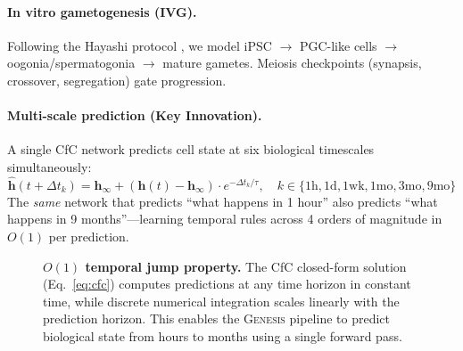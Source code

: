 \documentclass[11pt,letterpaper]{article}
\newcommand{\hv}{\mathbf{h}}
\newcommand{\genesis}{\textsc{Genesis}}
\begin{document}
\paragraph{In vitro gametogenesis (IVG).} Following the Hayashi protocol
\cite{hayashi2016offspring}, we model iPSC $\rightarrow$ PGC-like cells
$\rightarrow$ oogonia/spermatogonia $\rightarrow$ mature gametes. Meiosis
checkpoints (synapsis, crossover, segregation) gate progression.

\paragraph{Multi-scale prediction (Key Innovation).} A single CfC network
predicts cell state at six biological timescales simultaneously:
\begin{equation}
\hat{\hv}(t + \Delta t_k) = \hv_\infty + (\hv(t) - \hv_\infty) \cdot e^{-\Delta t_k / \tau}, \quad k \in \{1\text{h}, 1\text{d}, 1\text{wk}, 1\text{mo}, 3\text{mo}, 9\text{mo}\}
\label{eq:multiscale}
\end{equation}
The \emph{same} network that predicts ``what happens in 1 hour'' also predicts
``what happens in 9 months''---learning temporal rules across 4 orders of
magnitude in $O(1)$ per prediction.

\begin{figure}[htbp]
\centering
{}
\caption{\textbf{$O(1)$ temporal jump property.} The CfC closed-form solution
(Eq.~\ref{eq:cfc}) computes predictions at any time horizon in constant time,
while discrete numerical integration scales linearly with the prediction
horizon. This enables the \genesis{} pipeline to predict biological state from
hours to months using a single forward pass.}
\label{fig:temporal_jump}
\end{figure}
\end{document}
